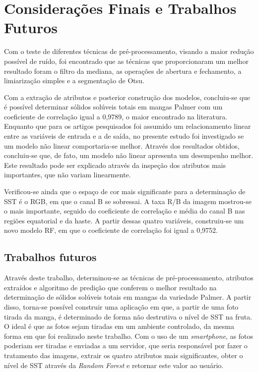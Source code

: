 \chapter{Considerações Finais e Trabalhos Futuros}

Com o teste de diferentes técnicas de pré-processamento, visando a maior redução possível de ruído, foi encontrado que as técnicas que proporcionaram um melhor resultado foram o filtro da mediana, as operações de abertura e fechamento, a limiarização simples e a segmentação de Otsu.

Com a extração de atributos e posterior construção dos modelos, concluiu-se que é possível determinar sólidos solúveis totais em mangas Palmer com um coeficiente de correlação igual a 0,9789, o maior encontrado na literatura. Enquanto que para os artigos pesquisados foi assumido um relacionamento linear entre as variáveis de entrada e a de saída, no presente estudo foi investigado se um modelo não linear comportaria-se melhor. Através dos resultados obtidos, concluiu-se que, de fato, um modelo não linear apresenta um desempenho melhor. Este resultado pode ser explicado através da inspeção dos atributos mais importantes, que não variam linearmente.

Verificou-se ainda que o espaço de cor mais significante para a determinação de SST é o RGB, em que o canal B se sobressai. A taxa R/B da imagem mostrou-se o mais importante, seguido do coeficiente de correlação e média do canal B nas regiões equatorial e da haste. A partir dessas quatro variáveis, construiu-se um novo modelo RF, em que o coeficiente de correlação foi igual a 0,9752.  
 
\section{Trabalhos futuros}

Através deste trabalho, determinou-se as técnicas de pré-processamento, atributos extraídos e algoritmo de predição que conferem o melhor resultado na determinação de sólidos solúveis totais em mangas da variedade Palmer. A partir disso, torna-se possível construir uma aplicação em que, a partir de uma foto tirada da manga, é determinado de forma não destrutiva o nível de SST na fruta. O ideal é que as fotos sejam tiradas em um ambiente controlado, da mesma forma em que foi realizado neste trabalho. Com o uso de um \textit{smartphone}, as fotos poderiam ser tiradas e enviadas a um servidor, que seria responsável por fazer o tratamento das imagens, extrair os quatro atributos mais significantes, obter o nível de SST através da \textit{Random Forest} e retornar este valor ao usuário.  

